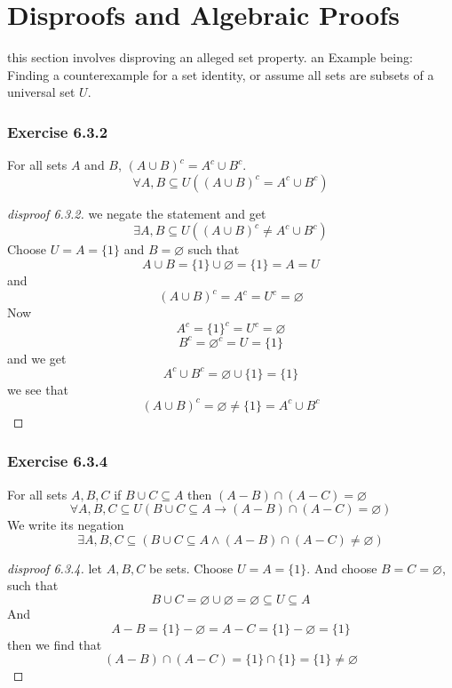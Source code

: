 \documentclass[12pt]{book}
\newcommand{\paren}[1]{\left( #1 \right)}
\newcommand{\then}{\rightarrow}
\begin{document}
    \section{Disproofs and Algebraic Proofs}
    this section involves disproving an alleged set property. an Example being: Finding a counterexample for a set identity, or assume all sets are subsets of a universal set $U$.

    \subsubsection{Exercise 6.3.2}
    For all sets $A$ and $B$, $\paren{A \cup B}^c = A^c \cup B^c$.
        \[
        \forall A,B \subseteq U \paren{\paren{A \cup B}^c = A^c \cup B^c}
        \]

    \begin{proof}[disproof 6.3.2]
    we negate the statement and get
    \[
    \exists A,B \subseteq U \paren{\paren{A \cup B}^c \neq A^c \cup B^c}
    \]
    Choose $U = A = \{1\}$ and $B = \varnothing$ such that
    \[
    A \cup B = \{1\} \cup \varnothing = \{1\} = A = U
    \]
    and
    \[
    \paren{A \cup B}^c = A^c = U^c = \varnothing
    \]
    Now
    \[
    A^c = \{1\}^c = U^c = \varnothing  
    \]
    \[
    B^c = \varnothing^c = U = \{1\}
    \]
    and we get
    \[
    A^c \cup B^c = \varnothing \cup \{1\} = \{1\}
    \]
    we see that
    \[
    \paren{A\cup B}^c = \varnothing \neq \{1\} = A^c \cup B^c
    \]
        
    \end{proof}
    

    \subsubsection{Exercise 6.3.4}
    For all sets $A,B,C$ if $B \cup C  \subseteq  A$ then \( \paren{A - B} \cap \paren{A - C} = \varnothing\)
    \[
    \forall A,B,C \subseteq U \paren{B \cup C \subseteq A \then (A-B)\cap (A-C) = \varnothing}
    \]
    We write its negation
    \[
    \exists A,B,C \subseteq \paren{B \cup C \subseteq A \wedge (A-B)\cap(A-C) \neq \varnothing}
    \]
    \begin{proof}[disproof 6.3.4]
    let $A,B,C$ be sets. Choose $U = A = \{1\}$. And choose $B = C = \varnothing$, such that
    \[
    B \cup C = \varnothing \cup \varnothing = \varnothing \subseteq U \subseteq A
    \]
    And 
    \[
    A - B = \{1\} - \varnothing = A - C = \{1\} - \varnothing = \{1\}
    \]
    then we find that
    \[
    \paren{A - B}\cap \paren{A - C} = \{1\} \cap \{1\} = \{1\} \neq \varnothing
    \]
    \end{proof}
\end{document}
